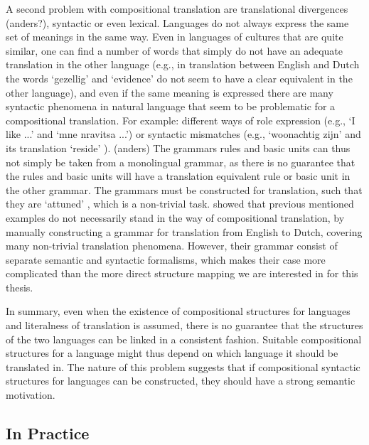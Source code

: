 \documentclass{report}
\newcommand\textcyr[1]{{\fontencoding{OT2}\fontfamily{wncyr}\selectfont #1}}
\theoremstyle{definition}
\theoremstyle{plain}
\begin{document}
A second problem with compositional translation are translational divergences (anders?), syntactic or even lexical. Languages do not always express the same set of meanings in the same way. Even in languages of cultures that are quite similar, one can find a number of words that simply do not have an adequate translation in the other language (e.g., in translation between English and Dutch the words `gezellig' and `evidence' do not seem to have a clear equivalent in the other language), and even if the same meaning is expressed there are many syntactic phenomena in natural language that seem to be problematic for a compositional translation.  For example: different ways of role expression (e.g., `I like ...' and `\textcyr{mne nravitsa ...}') or syntactic mismatches (e.g., `woonachtig zijn' and its translation `reside' \citep{landsbergen1989power}).  (anders) The grammars rules and basic units can thus not simply be taken from a monolingual grammar, as there is no guarantee that the rules and basic units will have a translation equivalent rule or basic unit in the other grammar. The grammars must be constructed for translation, such that they are `attuned' \citep{rosetta1994compositional}, which is a non-trivial task. \cite{rosetta1994compositional} showed that previous mentioned examples do not necessarily stand in the way of compositional translation, by manually constructing a grammar for translation from English to Dutch, covering many non-trivial translation phenomena. However, their grammar consist of separate semantic and syntactic formalisms, which makes their case more complicated than the more direct structure mapping we are interested in for this thesis.

In summary, even when the existence of compositional structures for languages and literalness of translation is assumed, there is no guarantee that the structures of the two languages can be linked in a consistent fashion. Suitable compositional structures for a language might thus depend on which language it should be translated in. The nature of this problem suggests that if compositional syntactic structures for languages  can be constructed, they should have a strong semantic motivation.

\subsection{In Practice}
\end{document}

